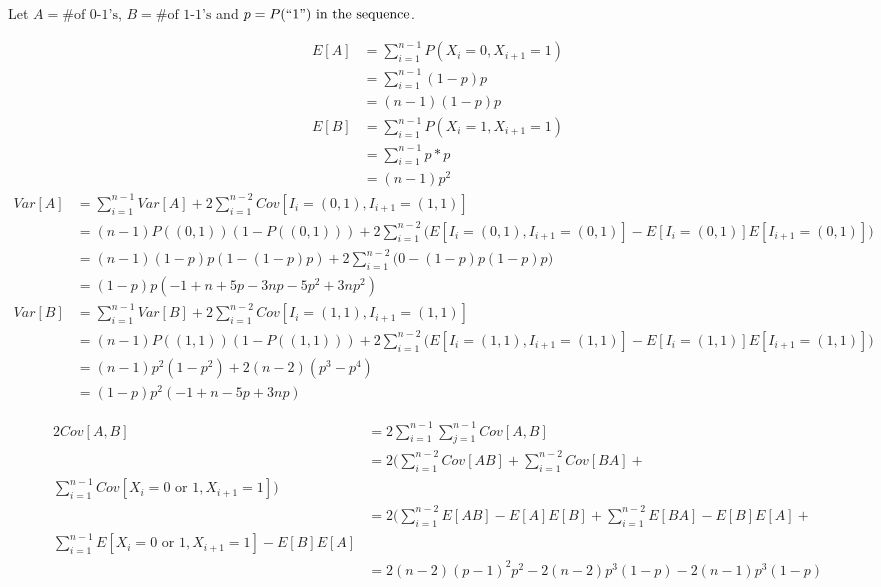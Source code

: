 \documentclass{article}
\begin{document}
    Let \(A = \text{\# of 0-1's}\), \(B = \text{\# of 1-1's}\) and \(p = P(``1")
    \text{ in the sequence}\).

    \begin{align*}
        E[A] 
            &= \sum_{i=1}^{n-1} P(X_i = 0, X_{i+1} = 1) \\
            &= \sum_{i=1}^{n-1} (1-p)p \\
            &= (n-1)(1-p)p
    \end{align*}
    \begin{align*}
        E[B]
            &= \sum_{i=1}^{n-1} P(X_i = 1, X_{i+1} = 1) \\
            &= \sum_{i=1}^{n-1} p*p \\
            &= (n-1)p^2
    \end{align*}
    \begin{align*}
        Var[A] 
            &= \sum_{i=1}^{n-1} Var[A] + 2\sum_{i=1}^{n-2} Cov[I_i = (0, 1),
               I_{i+1} = (1, 1)] \\
            &= (n-1)P((0, 1))(1-P((0, 1))) + 2\sum_{i=1}^{n-2}\bigg(E[I_i=(0, 
               1), I_{i+1} = (0, 1)] - E[I_i = (0, 1)]E[I_{i+1} = (0, 1)]\bigg)
               \\
            &= (n-1)(1-p)p(1-(1-p)p) + 2\sum_{i=1}^{n-2}\bigg(0 - (1-p)p(1-p)p
               \bigg) \\
            &= (1-p)p(-1+n+5p-3np-5p^2+3np^2)
    \end{align*}
    \begin{align*}
        Var[B] 
            &= \sum_{i=1}^{n-1} Var[B] + 2\sum_{i=1}^{n-2} Cov[I_i = (1, 1),
               I_{i+1} = (1, 1)] \\
            &= (n-1)P((1, 1))(1-P((1, 1))) + 2\sum_{i=1}^{n-2}\bigg(E[I_i=(1, 
               1), I_{i+1} = (1, 1)] - E[I_i = (1, 1)]E[I_{i+1} = (1, 1)]\bigg) 
               \\
            &= (n-1)p^2(1-p^2) + 2(n-2)(p^3-p^4) \\
            &= (1-p)p^2(-1+n-5p+3np)
    \end{align*}
	
	\begin{align*}
		2Cov[A, B]  
			&= 2 \sum_{i=1}^{n-1} \sum_{j=1}^{n-1} Cov[A, B]\\
			&= 2 \bigg(\sum_{i=1}^{n-2} Cov[AB] + \sum_{i=1}^{n-2} Cov[BA] +
				\\ \sum_{i=1}^{n-1} Cov[X_i = 0 \text{ or } 1, X_{i+1} = 1]\bigg) \\
			&= 2 \bigg(\sum_{i=1}^{n-2} E[AB] - E[A]E[B] + 
				\sum_{i=1}^{n-2} E[BA] - E[B]E[A] + \\
				\sum_{i=1}^{n-1} E[X_i = 0 \text{ or } 1, X_{i+1} = 1] - E[B]E[A] \\
			&= 2(n-2)(p-1)^2p^2 - 2(n-2)p^3(1-p) - 2(n-1)p^3(1-p)			
	\end{align*}
\end{document}
